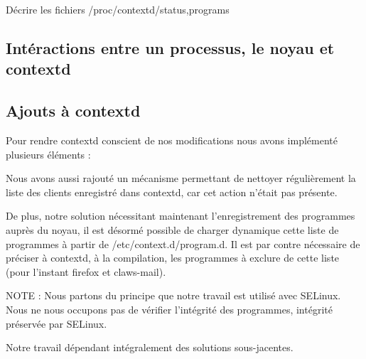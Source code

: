 Décrire les fichiers /proc/contextd/{status,programs}

\subsection{Intéractions entre un processus, le noyau et contextd}


\subsection{Ajouts à contextd}

Pour rendre contextd conscient de nos modifications nous avons implémenté plusieurs éléments :


Nous avons aussi rajouté un mécanisme permettant de nettoyer régulièrement la liste des clients enregistré dans contextd, car cet action n'était pas présente.

De plus, notre solution nécessitant maintenant l'enregistrement des programmes auprès du noyau, il est désormé possible de charger dynamique cette liste de programmes à partir de /etc/context.d/program.d. Il est par contre nécessaire de préciser à contextd, à la compilation, les programmes à exclure de cette liste (pour l'instant firefox et claws-mail).

% 
% 
% 

NOTE : Nous partons du principe que notre travail est utilisé avec SELinux. Nous ne nous occupons pas de vérifier l'intégrité des programmes, intégrité préservée par SELinux.

Notre travail dépendant intégralement des solutions sous-jacentes.